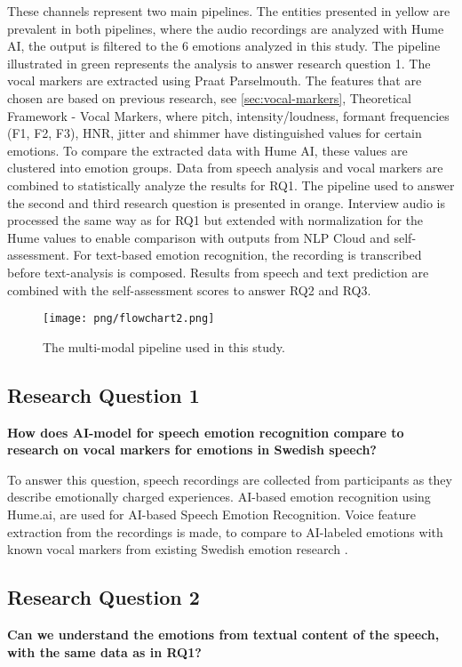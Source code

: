 These channels represent two main pipelines.  
The entities presented in yellow are prevalent in both pipelines, where the audio recordings are analyzed with Hume AI, the output is filtered to the 6 emotions analyzed in this study.  
The pipeline illustrated in green represents the analysis to answer research question 1.  
The vocal markers are extracted using Praat Parselmouth.  
The features that are chosen are based on previous research, see \ref{sec:vocal-markers}, Theoretical Framework - Vocal Markers, where pitch, intensity/loudness, formant frequencies (F1, F2, F3), HNR,  
jitter and shimmer have distinguished values for certain emotions.  
To compare the extracted data with Hume AI, these values are clustered into emotion groups.  
Data from speech analysis and vocal markers are combined to statistically analyze the results for RQ1.  
The pipeline used to answer the second and third research question is presented in orange. 
Interview audio is processed the same way as for RQ1 but extended with normalization for the Hume values to enable comparison with outputs from NLP Cloud and self-assessment.  
For text-based emotion recognition, the recording is transcribed before text-analysis is composed. 
Results from speech and text prediction are combined with the self-assessment scores to answer RQ2 and RQ3. 

\begin{figure}[H]
    \centering
    \texttt{[image: png/flowchart2.png]}
    \caption{The multi-modal pipeline used in this study.}
    \label{fig:pipeline}
\end{figure}


\subsection{Research Question 1}
\textbf{How does AI-model for speech emotion recognition compare to research on vocal markers for emotions in Swedish speech?}

To answer this question, speech recordings are collected from participants as they describe emotionally charged experiences. AI-based emotion recognition using Hume.ai, are used for AI-based Speech Emotion Recognition. Voice feature extraction from the recordings is made, to compare to AI-labeled emotions with known vocal markers from existing Swedish emotion research \autocite{Ekberg2023}. 

\subsection{Research Question 2}
\textbf{Can we understand the emotions from textual content of the speech, with the same data as in RQ1? }

